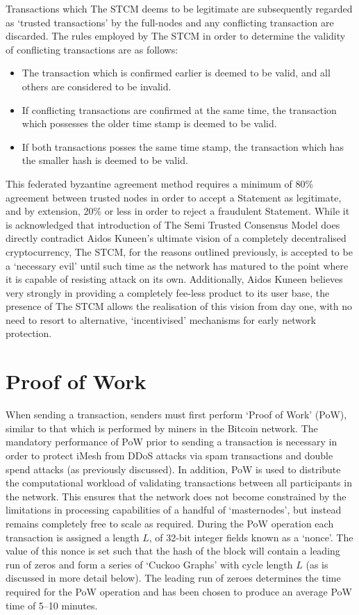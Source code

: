 \documentclass[a4paper,10pt,twocolumn]{article}
\begin{document}
Transactions which The STCM deems to be legitimate are subsequently regarded as `trusted transactions' by the full-nodes and any conflicting transaction are discarded. The rules employed by The STCM in order to determine the validity of conflicting transactions are as follows:

\begin{itemize}
	\item The transaction which is confirmed earlier is deemed to be valid, and all others are considered to be invalid.
	\item If conflicting transactions are confirmed at the same time, the transaction which possesses the older time stamp is deemed 
	to be valid.
	\item If both transactions posses the same time stamp, the transaction which has the smaller hash
	is deemed to be valid.
\end{itemize}

This federated byzantine agreement method requires a minimum of 80\% agreement between trusted nodes in order to accept a Statement as legitimate, and by extension, 20\% or less in order to reject a fraudulent Statement.
While it is acknowledged that introduction of The Semi Trusted Consensus Model does directly contradict Aidos Kuneen's ultimate 
vision of a completely decentralised cryptocurrency, The STCM, for the reasons outlined previously, is accepted to be a
`necessary evil' until such time as the network has matured to the point where it is capable of resisting attack on its own. 
Additionally, Aidos Kuneen believes very strongly in providing a completely fee-less product to its user base,
the presence of The STCM allows the realisation of this vision from day one, with no need to resort to alternative, `incentivised' 
mechanisms for early network protection.

\section{Proof of Work}
\label{sec:PoW}

When sending a transaction, senders must first perform `Proof of Work' (PoW), similar to that which is performed by miners in the 
Bitcoin network. The mandatory performance of PoW prior to sending a transaction is necessary in order to protect iMesh from DDoS 
attacks via spam transactions and double spend attacks (as previously discussed). In addition, PoW is used to distribute the 
computational workload of validating transactions between all participants in the network. This ensures that the network does not 
become constrained by the limitations in processing capabilities of a handful of `masternodes', but instead remains completely free to 
scale as required. During the PoW operation each transaction is assigned a length \(L\), of 32-bit integer fields known as a `nonce'. 
The value of this nonce is set such that the hash of the block will contain a leading run of zeros and form a series of `Cuckoo Graphs' with cycle length \(L\) (as is discussed in more detail below). The leading run of zeroes determines the time required for the PoW operation and has been chosen to produce an 
average PoW time of 5--10 minutes.
\end{document}
